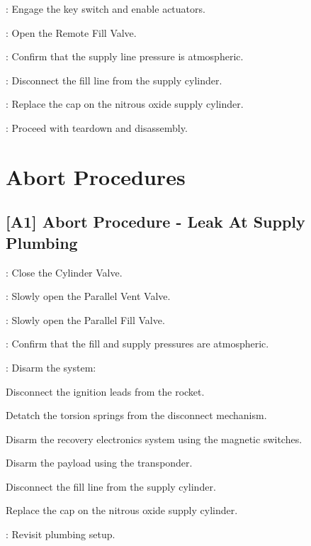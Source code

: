 \begin{checklist}
    \item \control{}: Engage the key switch and enable actuators.
    \item \control{}: Open the Remote Fill Valve.
    \item \control{}: Confirm that the supply line pressure is atmospheric.
    \item \primary{}: Disconnect the fill line from the supply cylinder.
    \item \primary{}: Replace the cap on the nitrous oxide supply cylinder.
    \item \ops{}: Proceed with teardown and disassembly.
\end{checklist}
\setcounter{checklistnum}{0}

\newpage
    
\section{Abort Procedures} 
\subsection{[A1] Abort Procedure - Leak At Supply Plumbing}
\begin{checklist}
    \item \primary{}: Close the Cylinder Valve.
    \item \primary{}: Slowly open the Parallel Vent Valve.
    \item \primary{}: Slowly open the Parallel Fill Valve.
    \item \control{}: Confirm that the fill and supply pressures are atmospheric.
    \item \primary{}: Disarm the system:
        \begin{checklist}    
            \item Disconnect the ignition leads from the rocket.
            \item Detatch the torsion springs from the disconnect mechanism.
            \item Disarm the recovery electronics system using the magnetic switches.
            \item Disarm the payload using the transponder.
            \item Disconnect the fill line from the supply cylinder.
            \item Replace the cap on the nitrous oxide supply cylinder.
        \end{checklist}
    \item \ops{}: Revisit plumbing setup.
\end{checklist}
\setcounter{checklistnum}{0}

